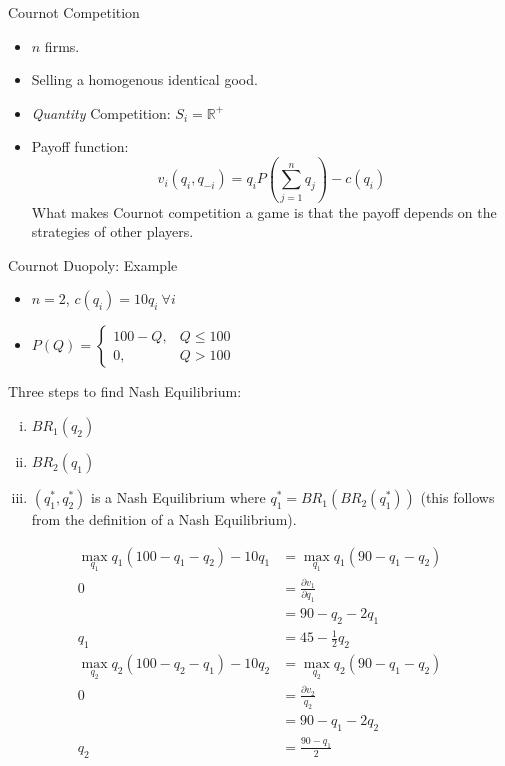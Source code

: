 \documentclass[8pt]{extarticle}
\begin{document}
  \begin{problem}{Cournot Competition}
    \begin{itemize}
      \item $n$ firms.
      \item Selling a homogenous identical good.
      \item \textit{Quantity} Competition: $S_i = \mathbb{R}^+$
      \item Payoff function:
        \[
          v_i(q_i,q_{-i}) = q_i P\left(\sum_{j = 1}^{n} q_j\right) - c(q_i)
        \] 
        What makes Cournot competition a game is that the payoff depends on the strategies of other players.
    \end{itemize}
  \end{problem}
  \begin{problem}{Cournot Duopoly: Example}
    \begin{itemize}
      \item $n=2$, $c(q_i) = 10q_i~\forall i$
      \item $P(Q) = \begin{cases}100-Q,&Q\leq 100\\0,&Q>100\end{cases}$
    \end{itemize}
    Three steps to find Nash Equilibrium:
    \begin{enumerate}[(i)]
      \item $BR_1(q_2)$
      \item $BR_2(q_1)$
      \item $(q_1^*,q_2^*)$ is a Nash Equilibrium where $q_1^* = BR_1(BR_2(q_1^*))$ (this follows from the definition of a Nash Equilibrium).
    \end{enumerate}
    \begin{align*}
      \max_{q_1} q_1(100-q_1-q_2)-10q_1 &= \max_{q_1} q_1(90-q_1-q_2)\\
      0 &= \frac{\partial v_1}{\partial q_1}\\
        &= 90-q_2-2q_1\\
      q_1 &= 45-\frac{1}{2}q_2
    \end{align*}
    \begin{align*}
      \max_{q_2} q_2(100-q_2-q_1)-10q_2 &= \max_{q_2}q_2(90-q_1-q_2)\\
      0&=\frac{\partial v_2}{q_2}\\
       &= 90-q_1-2q_2\\
      q_2 &= \frac{90-q_1}{2}
    \end{align*}
    \begin{description}

\end{description}
\end{problem}
\end{document}
